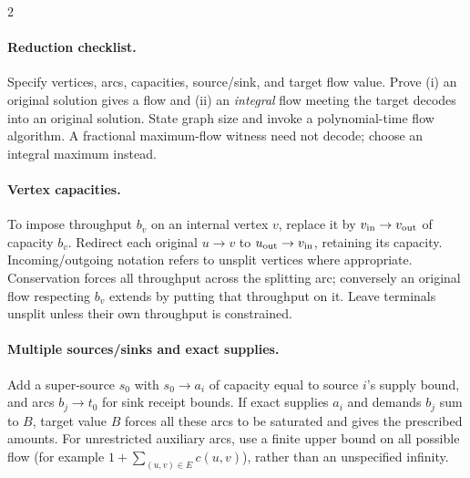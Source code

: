 \documentclass[8pt]{extarticle}
\theoremstyle{definition}
\begin{document}
\begin{multicols*}{2}
\paragraph{Reduction checklist.}
Specify vertices, arcs, capacities, source/sink, and target flow value.
Prove (i) an original solution gives a flow and (ii) an \emph{integral} flow
meeting the target decodes into an original solution. State graph size and
invoke a polynomial-time flow algorithm. A fractional maximum-flow witness
need not decode; choose an integral maximum instead.

\paragraph{Vertex capacities.}
To impose throughput $b_v$ on an internal vertex $v$, replace it by
$v_{\rm in}\to v_{\rm out}$ of capacity $b_v$. Redirect each original
$u\to v$ to $u_{\rm out}\to v_{\rm in}$, retaining its capacity.
Incoming/outgoing notation refers to unsplit vertices where appropriate.
Conservation forces all throughput across the splitting arc; conversely an
original flow respecting $b_v$ extends by putting that throughput on it.
Leave terminals unsplit unless their own throughput is constrained.

\paragraph{Multiple sources/sinks and exact supplies.}
Add a super-source $s_0$ with $s_0\to a_i$ of capacity equal to source $i$'s
supply bound, and arcs $b_j\to t_0$ for sink receipt bounds.
If exact supplies $a_i$ and demands $b_j$ sum to $B$, target value $B$ forces
all these arcs to be saturated and gives the prescribed amounts.
For unrestricted auxiliary arcs, use a finite upper bound on all possible
flow (for example $1+\sum_{(u,v)\in E}c(u,v)$), rather than an
unspecified infinity.


\end{multicols*}
\end{document}

